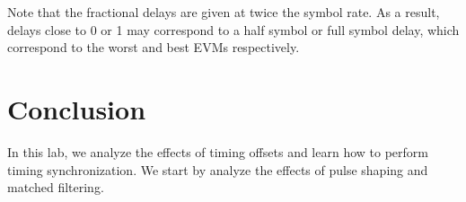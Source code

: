 \documentclass{article}
\begin{document}
\noindent Note that the fractional delays are given at twice the symbol rate. As a result, delays close to 0 or 1 may correspond to a half symbol or full symbol delay, which correspond to the worst and best EVMs respectively.

\section{Conclusion}

In this lab, we analyze the effects of timing offsets and learn how to perform timing synchronization. We start by analyze the effects of pulse shaping and matched filtering. 
\end{document}
